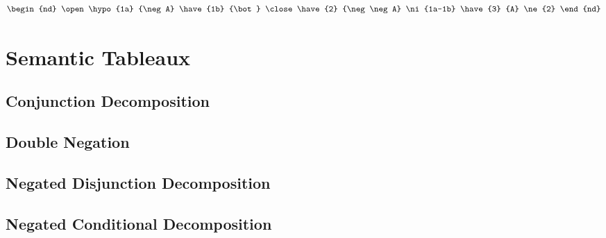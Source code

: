 \documentclass[12pt,a4paper,openany]{article}
\begin{document}
\[
\begin{nd}
 \open
 \hypo{1a} {\neg A}
 \have{1b} {\bot}
 \close
 \have{2} {\neg\neg A}  \ni{1a-1b}
  \have{3} {A} \ne{2}
\end{nd}
\]


\section{Semantic Tableaux}

\subsection{Conjunction Decomposition }
\begin{center}
\end{center}

\subsection{Double Negation}
\begin{center}
\end{center}

\subsection{Negated Disjunction Decomposition}
\begin{center}
\end{center}

\subsection{Negated Conditional Decomposition }
\end{document}
